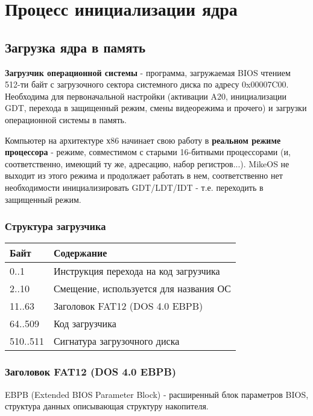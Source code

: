 \documentclass[12pt]{article}
\begin{document}
\newpage
\section{Процесс инициализации ядра}
\subsection{Загрузка ядра в память}
	\textbf{Загрузчик операционной системы} - программа, загружаемая BIOS
чтением 512-ти байт с загрузочного сектора системного диска по адресу
0x00007C00. Необходима для первоначальной настройки (активации A20,
инициализации GDT, перехода в защищенный режим, смены видеорежима и прочего)
и загрузки операционной системы в память.
	
	Компьютер на архитектуре х86 начинает свою работу в \textbf{реальном
режиме процессора} - режиме, совместимом с старыми 16-битными процессорами
(и, соответственно, имеющий ту же, адресацию, набор регистров...). MikeOS
не выходит из этого режима и продолжает работать в нем, соответственно
нет необходимости инициализировать GDT/LDT/IDT - т.е. переходить в защищенный
режим.

\subsubsection{Структура загрузчика}
	\begin{tabular}{|l|l|}
		\hline
		Байт     & Содержание                  			  \\ \hline
		0..1	 & Инструкция перехода на код загрузчика  \\ \hline
		2..10    & Смещение, используется для названия ОС \\ \hline
		11..63   & Заголовок FAT12 (DOS 4.0 EBPB)		  \\ \hline
		64..509  & Код загрузчика              			  \\ \hline
		510..511 & Сигнатура загрузочного диска			  \\ 
		\hline
	\end{tabular}
\subsubsection{Заголовок FAT12 (DOS 4.0 EBPB)}
	EBPB (Extended BIOS Parameter Block) - расширенный блок параметров BIOS,
структура данных описывающая структуру накопителя.
\end{document}
